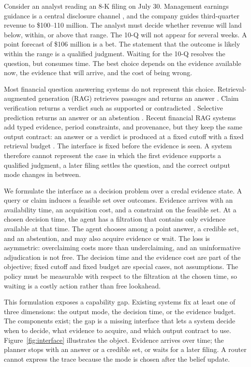 \documentclass[11pt]{article}
\begin{document}
Consider an analyst reading an 8-K filing on July 30. Management earnings guidance is a central disclosure channel \citep{hirst2008management}, and the company guides third-quarter revenue to \$100--110 million. The analyst must decide whether revenue will land below, within, or above that range. The 10-Q will not appear for several weeks. A point forecast of \$106 million is a bet. The statement that the outcome is likely within the range is a qualified judgment. Waiting for the 10-Q resolves the question, but consumes time. The best choice depends on the evidence available now, the evidence that will arrive, and the cost of being wrong.

Most financial question answering systems do not represent this choice. Retrieval-augmented generation (RAG) retrieves passages and returns an answer \citep{lewis2020rag,jiang2023flare,asai2024selfrag,jeong2024adaptiverag}. Claim verification returns a verdict such as supported or contradicted \citep{zhao2024findver,rangapur2025finfact}. Selective prediction returns an answer or an abstention \citep{chow1970optimum,geifman2017selective}. Recent financial RAG systems add typed evidence, period constraints, and provenance, but they keep the same output contract: an answer or a verdict is produced at a fixed cutoff with a fixed retrieval budget \citep{mansouri2026finrank,jiang2026finrate,chen2026hcrag,chi2026finsagent}. The interface is fixed before the evidence is seen. A system therefore cannot represent the case in which the first evidence supports a qualified judgment, a later filing settles the question, and the correct output mode changes in between.

We formulate the interface as a decision problem over a credal evidence state. A query or claim induces a feasible set over outcomes. Evidence arrives with an availability time, an acquisition cost, and a constraint on the feasible set. At a chosen decision time, the agent has a filtration that contains only evidence available at that time. The agent chooses among a point answer, a credible set, and an abstention, and may also acquire evidence or wait. The loss is asymmetric: overclaiming costs more than underclaiming, and an uninformative adjudication is not free. The decision time and the evidence cost are part of the objective; fixed cutoff and fixed budget are special cases, not assumptions. The policy must be measurable with respect to the filtration at the chosen time, so waiting is a costly action rather than free lookahead.

This formulation exposes a capability gap. Existing systems fix at least one of three dimensions: the output mode, the decision time, or the evidence budget. The components exist; the gap is a missing interface that lets a system decide when to decide, what evidence to acquire, and which output contract to use. Figure~\ref{fig:interface} illustrates the object. Evidence arrives over time; the planner stops with an answer or a credible set, or waits for a later filing. A router cannot express the trace because the mode is chosen after the belief update.
\end{document}

